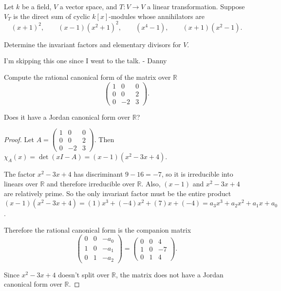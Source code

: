 \documentclass[addpoints,10pt]{exam}
\theoremstyle{plain}
\theoremstyle{definition}
\newtheorem{prob}[thm]{Problem}
\theoremstyle{plain}
\theoremstyle{plain}
\theoremstyle{definition}
\let\oldprob\prob
\let\endoldprob\endprob
\renewenvironment{prob}
  {\begin{singlespace}\oldprob}
  {\endoldprob\end{singlespace}}
\newcommand{\RR}{\ensuremath{\mathbb{R}}}
\begin{document}
\setcounter{thm}{0}

\begin{prob}
Let $k$ be a field, $V$ a vector space, and $T:V\to V$ a linear transformation.
Suppose $V_{T}$ is the direct sum of cyclic $k[x]$-modules whose annihilators are
\[
(x+1)^2,\qquad
(x-1)(x^2+1)^2,\qquad
(x^4-1),\qquad
(x+1)(x^2-1).
\]

Determine the invariant factors and elementary divisors for $V$.
\end{prob}

I'm skipping this one since I went to the talk. - Danny

\newpage

\begin{prob}
Compute the rational canonical form of the matrix over $\RR$
\[
\begin{pmatrix}
1&0&0\\
0&0&2\\
0&-2&3
\end{pmatrix}.
\]

Does it have a Jordan canonical form over $\RR$?
\end{prob}

\begin{proof}
Let
$A=\begin{pmatrix}1&0&0\\0&0&2\\0&-2&3\end{pmatrix}$.
Then
$\chi_A(x)=\det(xI-A)=(x-1)(x^2-3x+4)$.

The factor $x^2-3x+4$ has discriminant $9-16=-7$, so it is irreducible
into linears over $\RR$ and therefore irreducible over $\RR$. Also, $(x-1)$ and $x^2-3x+4$ are relatively prime. So the only
invariant factor must be the entire product
$(x-1)(x^2-3x+4)=(1)x^3+(-4)x^2+(7)x+(-4)=a_{3}x^{3}+a_{2}x^{2}+a_{1}x+a_{0}$.

Therefore the rational canonical form is the companion matrix
\[
\begin{pmatrix}
0&0&-a_{0}\\
1&0&-a_{1}\\
0&1&-a_{2}
\end{pmatrix} = \begin{pmatrix}
0&0&4\\
1&0&-7\\
0&1&4
\end{pmatrix}.
\]

Since $x^2-3x+4$ doesn't split over $\RR$, the matrix does not have a
Jordan canonical form over $\RR$.

\end{proof}
\end{document}
